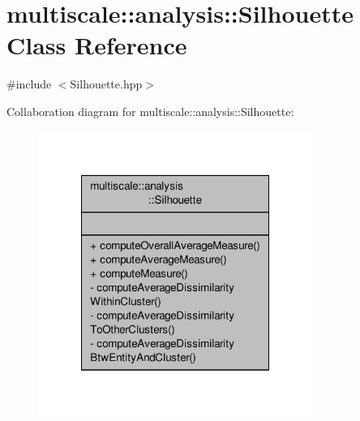 \hypertarget{classmultiscale_1_1analysis_1_1Silhouette}{\section{multiscale\-:\-:analysis\-:\-:Silhouette Class Reference}
\label{classmultiscale_1_1analysis_1_1Silhouette}
}


{\ttfamily \#include $<$Silhouette.\-hpp$>$}



Collaboration diagram for multiscale\-:\-:analysis\-:\-:Silhouette\-:\nopagebreak
\begin{figure}[H]
\begin{center}
\leavevmode
\includegraphics[width=252pt]{classmultiscale_1_1analysis_1_1Silhouette__coll__graph}
\end{center}
\end{figure}
